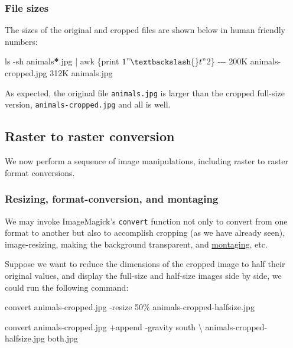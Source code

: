 \documentclass[
  11pt,
  british,
  a4paper,
]{article}
\newenvironment{Shaded}{\begin{snugshade}}{\end{snugshade}}
\newcommand{\AttributeTok}[1]{\textcolor[rgb]{0.80,0.80,0.80}{#1}}
\newcommand{\DataTypeTok}[1]{\textcolor[rgb]{0.87,0.87,0.75}{#1}}
\newcommand{\ExtensionTok}[1]{\textcolor[rgb]{0.80,0.80,0.80}{#1}}
\newcommand{\FunctionTok}[1]{\textcolor[rgb]{0.94,0.94,0.56}{#1}}
\newcommand{\KeywordTok}[1]{\textcolor[rgb]{0.94,0.87,0.69}{#1}}
\newcommand{\NormalTok}[1]{\textcolor[rgb]{0.80,0.80,0.80}{#1}}
\newcommand{\PreprocessorTok}[1]{\textcolor[rgb]{1.00,0.81,0.69}{\textbf{#1}}}
\newcommand{\StringTok}[1]{\textcolor[rgb]{0.80,0.58,0.58}{#1}}
\begin{document}
\hypertarget{file-sizes}{%
\subsubsection{File sizes}\label{file-sizes}}

The sizes of the original and cropped files are shown below in human
friendly numbers:

\begin{Shaded}
\begin{Highlighting}[]
\FunctionTok{ls} \AttributeTok{{-}sh}\NormalTok{ animals}\PreprocessorTok{*}\NormalTok{.jpg }\KeywordTok{|} \FunctionTok{awk} \StringTok{\textquotesingle{}\{print $1 "\textbackslash{}t" $2\}\textquotesingle{}}
\ExtensionTok{{-}{-}{-}}
\ExtensionTok{200K}\NormalTok{    animals{-}cropped.jpg}
\ExtensionTok{312K}\NormalTok{    animals.jpg}
\end{Highlighting}
\end{Shaded}

As expected, the original file \texttt{animals.jpg} is larger than the
cropped full-size version, \texttt{animals-cropped.jpg} and all is well.

\hypertarget{raster-to-raster-conversion}{%
\subsection{Raster to raster
conversion}\label{raster-to-raster-conversion}}

We now perform a sequence of image manipulations, including raster to
raster format conversions.

\hypertarget{resizing-format-conversion-and-montaging}{%
\subsubsection{Resizing, format-conversion, and
montaging}\label{resizing-format-conversion-and-montaging}}

We may invoke ImageMagick's \texttt{convert} function not only to
convert from one format to another but also to accomplish cropping (as
we have already seen), image-resizing, making the background
transparent, and
\href{https://www.thefreedictionary.com/montage}{montaging}, etc.

Suppose we want to reduce the dimensions of the cropped image to half
their original values, and display the full-size and half-size images
side by side, we could run the following command:

\begin{Shaded}
\begin{Highlighting}[]
\ExtensionTok{convert}\NormalTok{ animals{-}cropped.jpg }\AttributeTok{{-}resize}\NormalTok{ 50\% animals{-}cropped{-}halfsize.jpg}

\ExtensionTok{convert}\NormalTok{ animals{-}cropped.jpg +append }\AttributeTok{{-}gravity}\NormalTok{ south }\DataTypeTok{\textbackslash{}}
\NormalTok{animals{-}cropped{-}halfsize.jpg both.jpg}
\end{Highlighting}
\end{Shaded}
\end{document}
